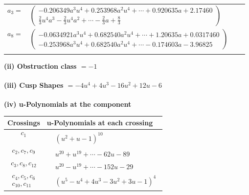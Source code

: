 \documentclass[1p]{elsarticle_modified}
\theoremstyle{definition}
\begin{document}
\begin{tabular}{m{7pt} m{180pt} m{7pt} m{180pt} }
\flushright $a_{3}=$&$\begin{pmatrix}-0.206349 a^{3} u^{4}+0.253968 a^{2} u^{4}+\cdots+0.920635 a+2.17460\\\frac{2}{3} u^4 a^3-\frac{2}{3} u^4 a^2+\cdots-\frac{2}{3} a+\frac{8}{3}\end{pmatrix}$ \\
\flushright $a_{8}=$&$\begin{pmatrix}-0.0634921 a^{3} u^{4}+0.682540 a^{2} u^{4}+\cdots+1.20635 a+0.0317460\\-0.253968 a^{3} u^{4}+0.682540 a^{2} u^{4}+\cdots-0.174603 a-3.96825\end{pmatrix}$\\&\end{tabular}
\flushleft \textbf{(ii) Obstruction class $= -1$}\\~\\
\flushleft \textbf{(iii) Cusp Shapes $= -4 u^4+4 u^3-16 u^2+12 u-6$}\\~\\
\newpage\renewcommand{\arraystretch}{1}
\flushleft \textbf{(iv) u-Polynomials at the component}\newline \\
\begin{tabular}{m{50pt}|m{274pt}}
Crossings & \hspace{64pt}u-Polynomials at each crossing \\
\hline $$\begin{aligned}c_{1}\end{aligned}$$&$\begin{aligned}
&(u^2+u-1)^{10}
\end{aligned}$\\
\hline $$\begin{aligned}c_{2},c_{7},c_{9}\end{aligned}$$&$\begin{aligned}
&u^{20}+u^{19}+\cdots-62 u-89
\end{aligned}$\\
\hline $$\begin{aligned}c_{3},c_{8},c_{12}\end{aligned}$$&$\begin{aligned}
&u^{20}- u^{19}+\cdots-152 u-29
\end{aligned}$\\
\hline $$\begin{aligned}c_{4},c_{5},c_{6}\\c_{10},c_{11}\end{aligned}$$&$\begin{aligned}
&(u^5- u^4+4 u^3-3 u^2+3 u-1)^4
\end{aligned}$\\
\hline
\end{tabular}\\~\\
\end{document}
